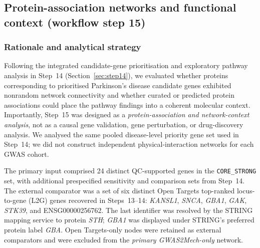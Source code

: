 \documentclass[11pt,a4paper]{article}
\begin{document}

\subsection{Protein-association networks and functional context (workflow step 15)}
\label{sec:step15_network}

\subsubsection{Rationale and analytical strategy}
Following the integrated candidate-gene prioritisation and exploratory pathway analysis in Step~14 (Section~\ref{sec:step14}), we evaluated whether proteins corresponding to prioritised Parkinson's disease candidate genes exhibited nonrandom network connectivity and whether curated or predicted protein associations could place the pathway findings into a coherent molecular context. Importantly, Step~15 was designed as a \emph{protein-association and network-context analysis}, not as a causal gene validation, gene perturbation, or drug-discovery analysis. We analysed the same pooled disease-level priority gene set used in Step~14; we did not construct independent physical-interaction networks for each GWAS cohort.

The primary input comprised 24 distinct QC-supported genes in the \texttt{CORE\_STRONG} set, with additional prespecified sensitivity and comparison sets from Step~14. The external comparator was a set of six distinct Open Targets top-ranked locus-to-gene (L2G) genes recovered in Steps~13--14: \textit{KANSL1}, \textit{SNCA}, \textit{GBA1}, \textit{GAK}, \textit{STK39}, and ENSG00000256762. The last identifier was resolved by the STRING mapping service to protein \textit{STH}; \textit{GBA1} was displayed under STRING's preferred protein label \textit{GBA}. Open Targets-only nodes were retained as external comparators and were excluded from the \emph{primary GWAS2Mech-only} network.
\end{document}
